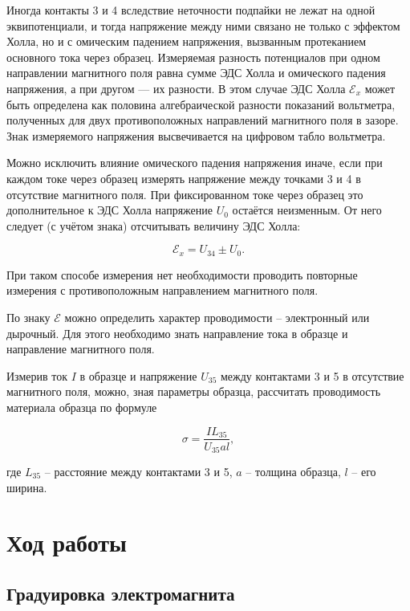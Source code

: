 \documentclass[a4paper,12pt]{article} %
\begin{document}
Иногда контакты 3 и 4 вследствие неточности подпайки не лежат на одной эквипотенциали, и тогда напряжение между ними связано не только с эффектом Холла, но и с омическим падением напряжения, вызванным протеканием основного тока через образец. Измеряемая разность потенциалов при одном направлении магнитного поля равна сумме ЭДС Холла и омического падения напряжения, а при другом — их разности. В этом случае ЭДС Холла $ \mathcal{E}_x $ может быть определена как половина алгебраической разности показаний вольтметра, полученных для двух противоположных направлений магнитного поля в зазоре. Знак измеряемого напряжения высвечивается на цифровом табло вольтметра.

Можно исключить влияние омического падения напряжения иначе, если при каждом токе через образец измерять напряжение между точками 3 и 4 в отсутствие магнитного поля. При фиксированном токе через образец это дополнительное к ЭДС Холла напряжение $ U_0 $ остаётся неизменным. От него следует (с учётом знака) отсчитывать величину ЭДС Холла:

\begin{equation}\label{3}
\mathcal{E}_x = U_{34} \pm U_0.
\end{equation}

При таком способе измерения нет необходимости проводить повторные измерения с противоположным направлением магнитного поля.

По знаку $ \mathcal{E} $ можно определить характер проводимости -- электронный или дырочный. Для этого необходимо знать направление тока в образце и направление магнитного поля.

Измерив ток $ I $ в образце и напряжение $ U_{35} $ между контактами 3 и 5 в отсутствие магнитного поля, можно, зная параметры образца, рассчитать проводимость материала образца по формуле

\begin{equation}\label{4}
\sigma = \frac{IL_{35}}{U_{35}al},
\end{equation}

где $ L_{35} $ -- расстояние между контактами 3 и 5, $ a $ -- толщина образца, $ l $ -- его ширина.

\section{Ход работы}

\subsection{Градуировка электромагнита}
\end{document}
